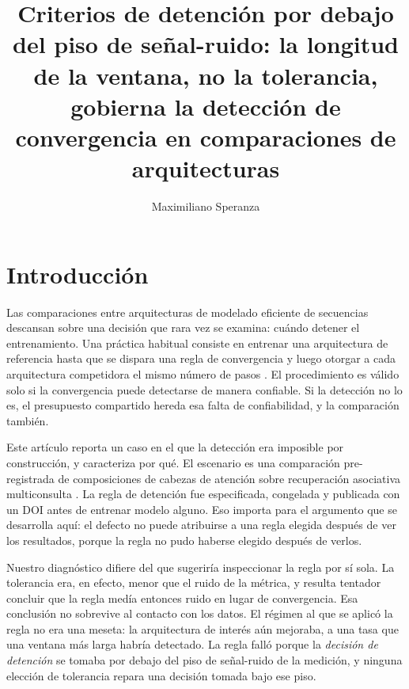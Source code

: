 \documentclass[jou,11pt,donotrepeattitle]{apa7}
\title{Criterios de detenci\'on por debajo del piso de se\~nal-ruido:
la longitud de la ventana, no la tolerancia, gobierna la detecci\'on de convergencia
en comparaciones de arquitecturas}
\author{Maximiliano Speranza}
\affiliation{Investigador independiente, Argentina}
\begin{document}
\maketitle

\section{Introducci\'on}

Las comparaciones entre arquitecturas de modelado eficiente de secuencias descansan sobre una
decisi\'on que rara vez se examina: cu\'ando detener el entrenamiento. Una pr\'actica habitual
consiste en entrenar una arquitectura de referencia hasta que se dispara una regla de
convergencia y luego otorgar a cada arquitectura competidora el mismo n\'umero de pasos
\parencite{li2019budgeted}. El procedimiento es v\'alido solo si la convergencia puede detectarse
de manera confiable. Si la detecci\'on no lo es, el presupuesto compartido hereda esa falta de
confiabilidad, y la comparaci\'on tambi\'en.

Este art\'iculo reporta un caso en el que la detecci\'on era imposible por construcci\'on, y
caracteriza por qu\'e. El escenario es una comparaci\'on pre-registrada de composiciones de
cabezas de atenci\'on sobre recuperaci\'on asociativa multiconsulta
\parencite[MQAR, por sus siglas en ingl\'es;][]{arora2023zoology}. La regla de detenci\'on fue
especificada, congelada y publicada con un DOI antes de entrenar modelo alguno. Eso importa para
el argumento que se desarrolla aqu\'i: el defecto no puede atribuirse a una regla elegida
despu\'es de ver los resultados, porque la regla no pudo haberse elegido despu\'es de verlos.

Nuestro diagn\'ostico difiere del que sugerir\'ia inspeccionar la regla por s\'i sola. La
tolerancia era, en efecto, menor que el ruido de la m\'etrica, y resulta tentador concluir que la
regla med\'ia entonces ruido en lugar de convergencia. Esa conclusi\'on no sobrevive al contacto
con los datos. El r\'egimen al que se aplic\'o la regla no era una meseta: la arquitectura de
inter\'es a\'un mejoraba, a una tasa que una ventana m\'as larga habr\'ia detectado. La regla
fall\'o porque la \emph{decisi\'on de detenci\'on} se tomaba por debajo del piso de se\~nal-ruido
de la medici\'on, y ninguna elecci\'on de tolerancia repara una decisi\'on tomada bajo ese piso.
\end{document}
